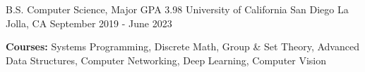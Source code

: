 
\begin{cventries}
  \cventry
    {B.S. Computer Science, Major GPA 3.98}
    {University of California San Diego}
    {La Jolla, CA}
    {September 2019 - June 2023}
    {
      \begin{cvitems}
        \item {\textbf{Courses:} Systems Programming, Discrete Math, Group \& Set Theory, Advanced Data Structures, Computer Networking, Deep Learning, Computer Vision}
      \end{cvitems}
    }
\end{cventries}
